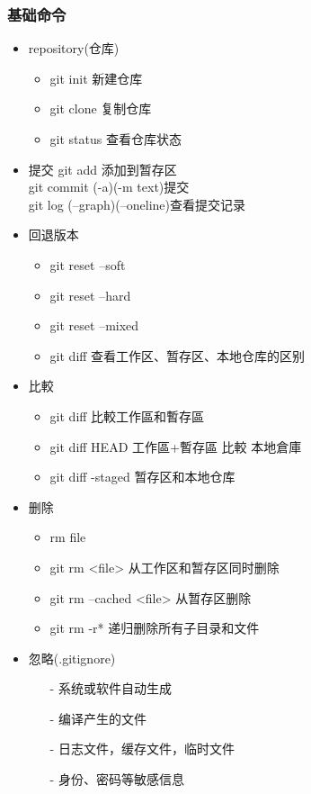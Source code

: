 \documentclass[a4paper,12pt]{article}
\begin{document}
\subsubsection{\color{green}基础命令}
\begin{itemize}
    \item \textsf{repository(仓库)}
          \begin{itemize}
              \item git init 新建仓库
              \item git clone 复制仓库
              \item git status 查看仓库状态
          \end{itemize}
    \item \textsf{提交}
          git add %
          添加到暂存区\\git commit (-a)(-m text)提交%
          \\git log (--graph)(--oneline)查看提交记录
    \item \textsf{回退版本}
          \begin{itemize}
              \item git reset --soft
              \item git reset --hard
              \item git reset --mixed
              \item git diff 查看工作区、暂存区、本地仓库的区别
          \end{itemize}
    \item \textsf{比較}
          \begin{itemize}
              \item git diff 比較工作區和暫存區
              \item git diff HEAD 工作區+暫存區 比較 本地倉庫
              \item git diff -staged 暂存区和本地仓库
          \end{itemize}
    \item \textsf{删除}
          \begin{itemize}
              \item rm file
              \item git rm <file> 从工作区和暂存区同时删除\cite{label1}
              \item git rm --cached <file> 从暂存区删除\cite{label2}
              \item git rm -r* 递归删除所有子目录和文件
          \end{itemize}
    \item \textsf{忽略(.gitignore)}
          \begin{itemize}
              \item[-] 系统或软件自动生成
              \item[-] 编译产生的文件
              \item[-] 日志文件，缓存文件，临时文件
              \item[-] 身份、密码等敏感信息
          \end{itemize}
\end{itemize}
\end{document}
